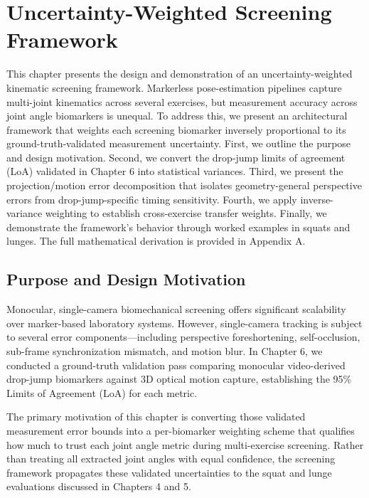 \chapter{Uncertainty-Weighted Screening Framework}
\label{ch:uncertainty}



This chapter presents the design and demonstration of an uncertainty-weighted kinematic screening framework. Markerless pose-estimation pipelines capture multi-joint kinematics across several exercises, but measurement accuracy across joint angle biomarkers is unequal. To address this, we present an architectural framework that weights each screening biomarker inversely proportional to its ground-truth-validated measurement uncertainty. First, we outline the purpose and design motivation. Second, we convert the drop-jump limits of agreement (LoA) validated in Chapter 6 into statistical variances. Third, we present the projection/motion error decomposition that isolates geometry-general perspective errors from drop-jump-specific timing sensitivity. Fourth, we apply inverse-variance weighting to establish cross-exercise transfer weights. Finally, we demonstrate the framework's behavior through worked examples in squats and lunges. The full mathematical derivation is provided in Appendix A.



\section{Purpose and Design Motivation}
\label{sec:8-1-purpose-and-design-motivation}


Monocular, single-camera biomechanical screening offers significant scalability over marker-based laboratory systems. However, single-camera tracking is subject to several error components—including perspective foreshortening, self-occlusion, sub-frame synchronization mismatch, and motion blur. In Chapter 6, we conducted a ground-truth validation pass comparing monocular video-derived drop-jump biomarkers against 3D optical motion capture, establishing the 95\% Limits of Agreement (LoA) for each metric.

The primary motivation of this chapter is converting those validated measurement error bounds into a per-biomarker weighting scheme that qualifies how much to trust each joint angle metric during multi-exercise screening. Rather than treating all extracted joint angles with equal confidence, the screening framework propagates these validated uncertainties to the squat and lunge evaluations discussed in Chapters 4 and 5.

